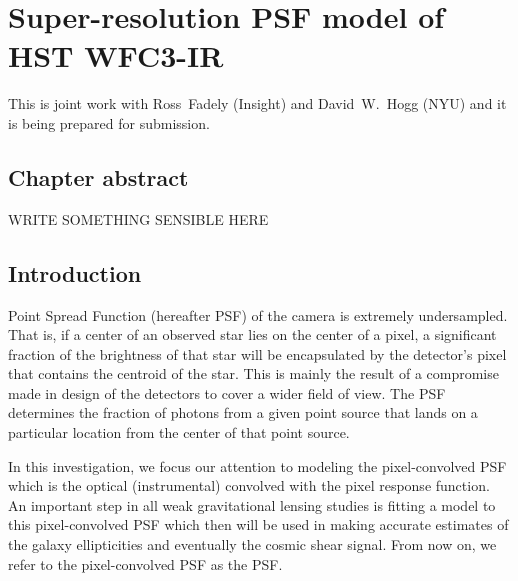 \newcommand{\todo}[1]{{\em \textcolor{red}{ #1}}}
\newcommand{\beq}{\begin{equation}}
\newcommand{\eeq}{\end{equation}}
\newcommand{\lang}{\langle}
\newcommand{\ra}{\rangle}
\newcommand{\vep}{\bm{\epsilon}}
\newcommand{\ep}{\epsilon}
\newcommand{\pars}{\vec{\theta}}
\newcommand{\dev}{\mathrm{d}}
\newcommand{\mstar}{h^{-1}M_\odot}

\chapter{Super-resolution PSF model of HST WFC3-IR}

This \paper is joint work with Ross~Fadely (Insight) and David~W.~Hogg (NYU) and it is being prepared for submission. 

\section{Chapter abstract}

WRITE SOMETHING SENSIBLE HERE

\section{Introduction}

Point Spread Function (hereafter PSF) of the \hst \wfc camera is 
extremely undersampled. That is, if a center of an observed star lies on the center of a pixel, a significant fraction of the brightness of that star will be 
encapsulated by the detector's pixel that contains the centroid of the star. 
This is mainly the result of a compromise made in design of the detectors to cover a wider field of view. The PSF determines the fraction of photons from a given point source that lands on a particular location from the center of that point source. 

In this investigation, we focus our attention to modeling the pixel-convolved PSF which is the optical (instrumental) convolved with the pixel response function. An important step in all weak gravitational lensing studies is fitting a model to this pixel-convolved PSF which then will be used in making accurate estimates of the galaxy ellipticities and eventually the cosmic shear signal. 
From now on, we refer to the pixel-convolved PSF as the PSF. 


